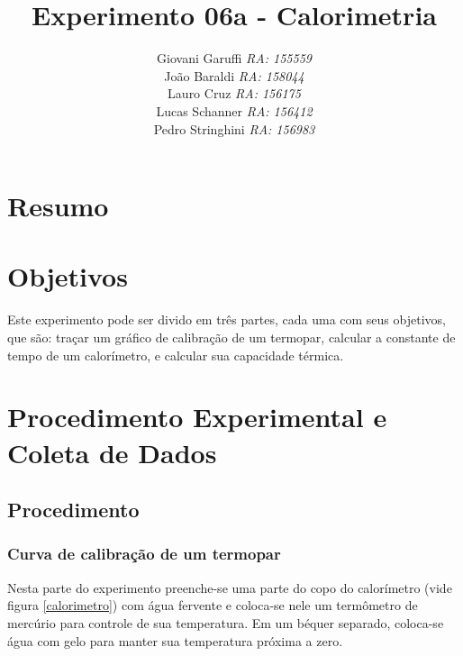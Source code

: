 \documentclass[12pt,a4paper]{article}
\begin{document}
\title{\vspace{70mm}\Huge Experimento 06a - Calorimetria}
\author{ Giovani Garuffi\qquad\hfill
		\textit {RA: 155559}\protect\\
		João Baraldi\hfill
		\textit{RA: 158044}\protect\\
		Lauro Cruz\hfill
		\textit{RA: 156175}\protect\\
		Lucas Schanner\hfill
		\textit{RA: 156412}\protect\\
		Pedro Stringhini\hfill
		\textit {RA: 156983}								
		}
\maketitle
\newpage
\section{Resumo}


\section{Objetivos}
Este experimento pode ser divido em três partes, cada uma com seus objetivos, que são: traçar um gráfico de calibração de um termopar, calcular a constante de tempo de um calorímetro, e calcular sua capacidade térmica.


\section{Procedimento Experimental e Coleta de Dados}


\subsection{Procedimento}


\subsubsection{Curva de calibração de um termopar}

Nesta parte do experimento preenche-se uma parte do copo do calorímetro (vide figura \ref{calorimetro}) com água fervente e coloca-se nele um termômetro de mercúrio para controle de sua temperatura. Em um béquer separado, coloca-se água com gelo para manter sua temperatura próxima a zero.\\
\end{document}
